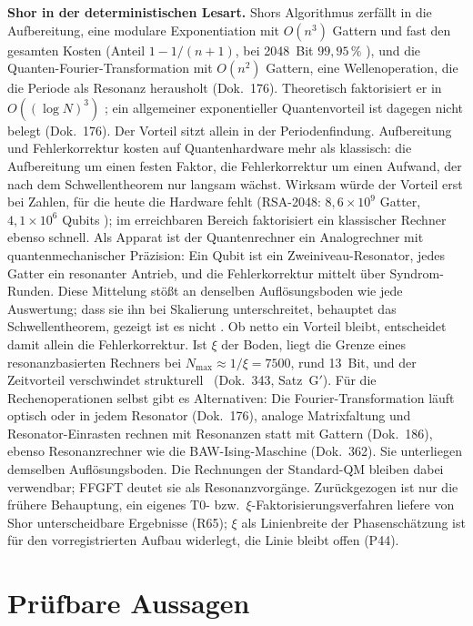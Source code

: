\textbf{Shor in der deterministischen Lesart.} Shors Algorithmus zerfällt in die Aufbereitung,
eine modulare Exponentiation mit $O(n^3)$ Gattern und fast den gesamten Kosten (Anteil
$1-1/(n+1)$, bei 2048~Bit $99{,}95\,\%$ \KM), und die
Quanten-Fourier-Transformation mit $O(n^2)$ Gattern, eine Wellenoperation, die die Periode als
Resonanz herausholt (Dok.~176). Theoretisch faktorisiert er in $O((\log N)^3)$ \KM; ein
allgemeiner exponentieller Quantenvorteil ist dagegen nicht belegt (Dok.~176). Der Vorteil sitzt allein
in der Periodenfindung. Aufbereitung und Fehlerkorrektur kosten auf Quantenhardware mehr als
klassisch: die Aufbereitung um einen festen Faktor, die Fehlerkorrektur um einen Aufwand, der
nach dem Schwellentheorem nur langsam wächst. Wirksam würde der Vorteil erst bei Zahlen, für
die heute die Hardware fehlt (RSA-2048: $8{,}6\times10^9$ Gatter, $4{,}1\times10^6$ Qubits \KM); im
erreichbaren Bereich faktorisiert ein klassischer Rechner ebenso schnell. Als Apparat ist der
Quantenrechner ein Analogrechner mit quantenmechanischer Präzision: Ein Qubit ist ein
Zweiniveau-Resonator, jedes Gatter ein resonanter Antrieb, und die Fehlerkorrektur mittelt über
Syndrom-Runden. Diese Mittelung stößt an denselben Auflösungsboden wie jede Auswertung; dass
sie ihn bei Skalierung unterschreitet, behauptet das Schwellentheorem, gezeigt ist es nicht
\SM. Ob netto ein Vorteil bleibt, entscheidet damit allein die Fehlerkorrektur. Ist $\xi$ der
Boden, liegt die Grenze eines resonanzbasierten Rechners bei $N_\mathrm{max}\approx1/\xi=7500$,
rund 13~Bit, und der Zeitvorteil verschwindet strukturell \SM\ (Dok.~343, Satz~G$'$).
Für die Rechenoperationen selbst gibt es Alternativen: Die Fourier-Transformation läuft optisch
oder in jedem Resonator (Dok.~176), analoge Matrixfaltung und Resonator-Einrasten rechnen mit
Resonanzen statt mit Gattern (Dok.~186), ebenso Resonanzrechner wie die BAW-Ising-Maschine
(Dok.~362). Sie unterliegen demselben Auflösungsboden. Die Rechnungen der Standard-QM bleiben
dabei verwendbar; FFGFT deutet sie als Resonanzvorgänge. Zurückgezogen ist nur die frühere
Behauptung, ein eigenes T0- bzw.\ $\xi$-Faktorisierungsverfahren liefere von Shor
unterscheidbare Ergebnisse (R65); $\xi$ als Linienbreite der Phasenschätzung ist für den
vorregistrierten Aufbau widerlegt, die Linie bleibt offen (P44).

\section{Prüfbare Aussagen}

